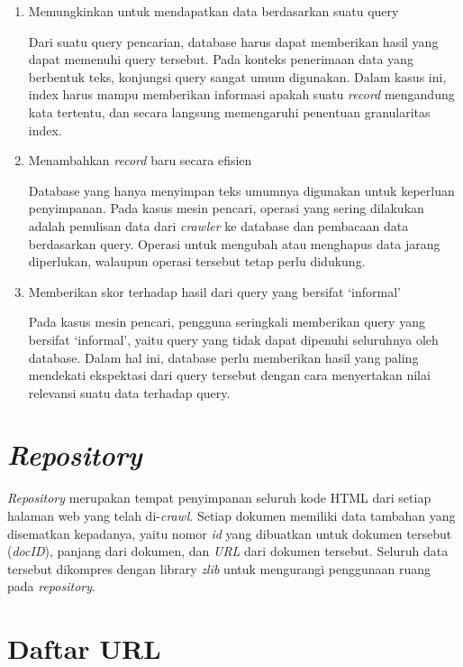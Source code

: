 \begin{enumerate}
  \item{Memungkinkan untuk mendapatkan data berdasarkan suatu query}

  Dari suatu query pencarian, database harus dapat memberikan hasil yang dapat
  memenuhi query tersebut. Pada konteks penerimaan data yang berbentuk teks,
  konjungsi query sangat umum digunakan. Dalam kasus ini, index harus mampu
  memberikan informasi apakah suatu \emph{record} mengandung kata tertentu, dan
  secara langsung memengaruhi penentuan granularitas index.

  \item{Menambahkan \emph{record} baru secara efisien}

  Database yang hanya menyimpan teks umumnya digunakan untuk keperluan
  penyimpanan. Pada kasus mesin pencari, operasi yang sering dilakukan adalah
  penulisan data dari \emph{crawler} ke database dan pembacaan data berdasarkan
  query. Operasi untuk mengubah atau menghapus data jarang diperlukan, walaupun
  operasi tersebut tetap perlu didukung.

  \item{Memberikan skor terhadap hasil dari query yang bersifat `informal'}

  Pada kasus mesin pencari, pengguna seringkali memberikan query yang bersifat
  `informal', yaitu query yang tidak dapat dipenuhi seluruhnya oleh database.
  Dalam hal ini, database perlu memberikan hasil yang paling mendekati
  ekspektasi dari query tersebut dengan cara menyertakan nilai relevansi suatu
  data terhadap query.
\end{enumerate}

\section{\emph{Repository}}

\emph{Repository} merupakan tempat penyimpanan seluruh kode HTML dari setiap
halaman web yang telah di-\emph{crawl}. Setiap dokumen memiliki data tambahan
yang disematkan kepadanya, yaitu nomor \emph{id} yang dibuatkan untuk dokumen
tersebut (\textit{docID}), panjang dari dokumen, dan \emph{URL} dari dokumen
tersebut. Seluruh data tersebut dikompres dengan library \emph{zlib} untuk
mengurangi penggunaan ruang pada \emph{repository}.

\section{Daftar URL}

